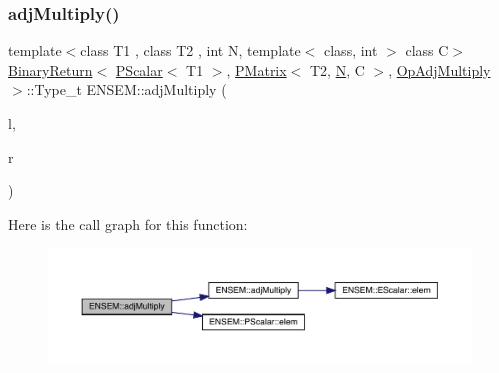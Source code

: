 \subsubsection{\texorpdfstring{adjMultiply()}{adjMultiply()}\hspace{0.1cm}{\footnotesize\ttfamily [2/3]}}
{\footnotesize\ttfamily template$<$class T1 , class T2 , int N, template$<$ class, int $>$ class C$>$ \\
\mbox{\hyperlink{structENSEM_1_1BinaryReturn}{Binary\+Return}}$<$ \mbox{\hyperlink{classENSEM_1_1PScalar}{P\+Scalar}}$<$ T1 $>$, \mbox{\hyperlink{classENSEM_1_1PMatrix}{P\+Matrix}}$<$ T2, \mbox{\hyperlink{operator__name__util_8cc_a7722c8ecbb62d99aee7ce68b1752f337}{N}}, C $>$, \mbox{\hyperlink{structENSEM_1_1OpAdjMultiply}{Op\+Adj\+Multiply}} $>$\+::Type\+\_\+t E\+N\+S\+E\+M\+::adj\+Multiply (\begin{DoxyParamCaption}\item[{const \mbox{\hyperlink{classENSEM_1_1PScalar}{P\+Scalar}}$<$ T1 $>$ \&}]{l,  }\item[{const \mbox{\hyperlink{classENSEM_1_1PMatrix}{P\+Matrix}}$<$ T2, \mbox{\hyperlink{operator__name__util_8cc_a7722c8ecbb62d99aee7ce68b1752f337}{N}}, C $>$ \&}]{r }\end{DoxyParamCaption})\hspace{0.3cm}{\ttfamily [inline]}}

Here is the call graph for this function\+:\nopagebreak
\begin{figure}[H]
\begin{center}
\leavevmode
\includegraphics[width=350pt]{df/d0a/group__primmatrix_ga01de3db0f09195f592339c9241bd4692_cgraph}
\end{center}
\end{figure}
\mbox{\label{group__primmatrix_gac28cbe7440b96e5650ac2c201b8c5ac2}} 
